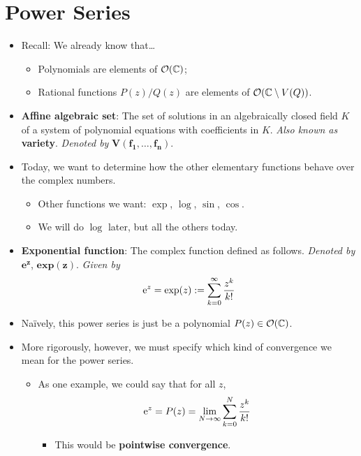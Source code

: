\documentclass[../notes.tex]{subfiles}
\begin{document}
\section{Power Series}
\begin{itemize}
    \item {}Recall: We already know that\dots
    \begin{itemize}
        \item Polynomials are elements of $\mO(\C)$;
        \item Rational functions $P(z)/Q(z)$ are elements of $\mO(\C\setminus V(Q))$.
    \end{itemize}
    \item \textbf{Affine algebraic set}: The set of solutions in an algebraically closed field $K$ of a system of polynomial equations with coefficients in $K$. \emph{Also known as} \textbf{variety}. \emph{Denoted by} $\bm{V(f_1,\ldots,f_n)}$.
    \item Today, we want to determine how the other elementary functions behave over the complex numbers.
    \begin{itemize}
        \item Other functions we want: $\exp$, $\log$, $\sin$, $\cos$.
        \item We will do $\log$ later, but all the others today.
    \end{itemize}
    \item \textbf{Exponential function}: The complex function defined as follows. \emph{Denoted by} $\textbf{e}^{\bm{z}}$, $\textbf{exp}\bm{(z)}$. \emph{Given by}
    \begin{equation*}
        \e[z] = \exp(z) := \sum_{k=0}^\infty\frac{z^k}{k!}
    \end{equation*}
    \item Na\"{i}vely, this power series is just be a polynomial $P(z)\in\mO(\C)$.
    \item More rigorously, however, we must specify which kind of convergence we mean for the power series.
    \begin{itemize}
        \item As one example, we could say that for all $z$,
        \begin{equation*}
            \e[z] = P(z) = \lim_{N\to\infty}\sum_{k=0}^N\frac{z^k}{k!}
        \end{equation*}
        \begin{itemize}
            \item This would be \textbf{pointwise convergence}.

\end{itemize}
\end{itemize}
\end{itemize}
\end{document}
